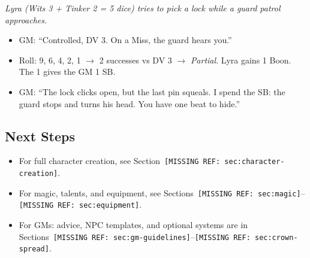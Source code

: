 \textit{Lyra (Wits 3 + Tinker 2 = 5 dice) tries to pick a lock while a guard patrol approaches.}

\begin{itemize}
  \item GM: ``Controlled, DV 3. On a Miss, the guard hears you.''
  \item Roll: 9, 6, 4, 2, 1 $\to$ 2 successes vs DV 3 $\to$ \textit{Partial}. Lyra gains 1 Boon. The 1 gives the GM 1 SB.
  \item GM: ``The lock clicks open, but the last pin squeals. I spend the SB: the guard stops and turns his head. You have one beat to hide.''
\end{itemize}

\subsection*{Next Steps}

\begin{itemize}
  \item For full character creation, see Section~\texttt{[MISSING REF: sec:character-creation]}.
  \item For magic, talents, and equipment, see Sections~\texttt{[MISSING REF: sec:magic]}--\texttt{[MISSING REF: sec:equipment]}.
  \item For GMs: advice, NPC templates, and optional systems are in Sections~\texttt{[MISSING REF: sec:gm-guidelines]}--\texttt{[MISSING REF: sec:crown-spread]}.
\end{itemize}